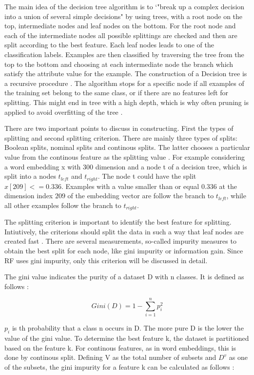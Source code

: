 \documentclass[12pt, a4paper, titlepage]{article}
\begin{document}
The main idea of the decision tree algorithm is to `"break up a complex decision into a union of several simple decisions" \citep[660]{safavian1991} by using trees, with a root node on the top, intermediate nodes and leaf nodes on the bottom. For the root node and each of the intermediate nodes all possible splittings are checked and then are split according to the best feature. Each leaf nodes leads to one of the classification labels. Examples are then classified by traversing the tree from the top to the bottom and choosing at each intermediate node the branch which satisfy the attribute value for the example. The construction of a Decision tree is a recursive procedure \citep{Berthold2020, xia2008, cutler2012}. The algorithm stops for a specific node if all examples of the training set belong to the same class, or if there are no features left for splitting. This might end in tree with a high depth, which is why often pruning is applied to avoid overfitting of the tree \citet{Berthold2020}.

There are two important points to discuss in constructing. First the types of splitting and second splitting criterion. There are mainly three types of splits: Boolean splits, nominal splits and continous splits. The latter chooses a particular value from the continous feature as the splitting value \citep{cutler2012, Berthold2020}. For example considering a word embedding x with 300 dimension and a node t of a decision tree, which is split into a nodes $t_{left}$ and $t_{right}$. The node t could have the split $x[209] <= 0.336$. Examples with a value smaller than or equal $0.336$ at the dimension index $209$ of the embedding vector are follow the branch to $t_{left}$, while all other examples follow the branch to $t_{right}$.

The splitting criterion is important to identify the best feature for splitting. Intiutively, the criterions should split the data in such a way that leaf nodes are created fast \citep{Berthold2020}. There are several measurements, so-called impurity measures to obtain the best split for each node, like gini impurity or information gain. Since \ac{RF} uses gini impurity, only this criterion will be discussed in detail. 

The gini value indicates the purity of a dataset D with n classes. It is defined as follows \citep[3156]{yuan2021}: 

\[Gini(D) = 1 - \sum_{i=1}^n p^2_i\]

$p_i$ is th probability that a class n occurs in D. The more pure D is the lower the value of the gini value. To determine the best feature k, the dataset is partitioned based on the feature k. For continous features, as in word embeddings, this is done by continous split. Defining V as the total number of subsets and $D^v$ as one of the subsets, the gini impurity for a feature k can be calculated as follows \cite{yuan2021}: 
\end{document}
